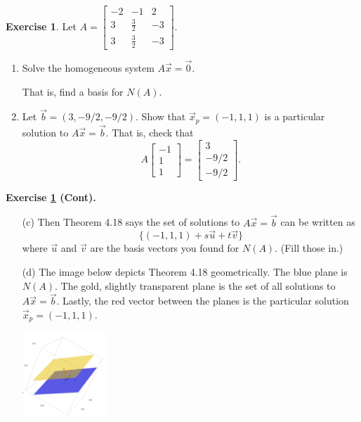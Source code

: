 \documentclass{beamer}
\newcommand{\fn}{\insertframenumber}
\theoremstyle{definition}
\newtheorem{exercise}{Exercise}
\begin{document}
\begin{frame}{\fn}
	\begin{exercise}\label{translation}
		Let $A=\left[\begin{array}{rrr}
		-2 & -1 & 2 \\
		3 & \frac{3}{2} & -3 \\
		3 & \frac{3}{2} & -3
		\end{array}\right]$.
		\begin{enumerate}[label=(\alph*)]
			\item Solve the homogeneous system $A\vec x=\vec 0$.  
			
			That is, find a basis for $N(A)$.
			\item Let $\vec b=(3, -9/2, -9/2)$.  Show that $\vec x_p = (-1,1,1)$ is a particular solution to $A\vec x=\vec b$.
			That is, check that
			\[A\begin{bmatrix}-1\\1\\1\end{bmatrix}=\begin{bmatrix}3\\-9/2\\-9/2\end{bmatrix}.\]
			
		\end{enumerate}
	\end{exercise}
	\end{frame}
\begin{frame}{\fn}
	\begin{block}{\textbf{Exercise \ref{translation} (Cont).}}
		\begin{enumerate}[label=(\alph*)]
			\item[(c)] Then Theorem 4.18 says the set of solutions to $A\vec x =\vec b$ can be written as
			\[\{(-1,1,1)+s\vec u+ t\vec v\}\]
			where $\vec u$ and $\vec v$ are the basis vectors you found for $N(A)$. (Fill those in.)
			\item[(d)] The image below depicts Theorem 4.18 geometrically.  The blue plane is $N(A)$.  The gold, slightly transparent plane is the set of all solutions to $A\vec x=\vec b$.  Lastly, the red vector between the planes is the particular solution $\vec x_p=(-1,1,1)$.
			\begin{center}
				\includegraphics[width=1.25in]{../images/solution_set}
			\end{center}
		\end{enumerate}
	\end{block}
\end{frame}
\end{document}
